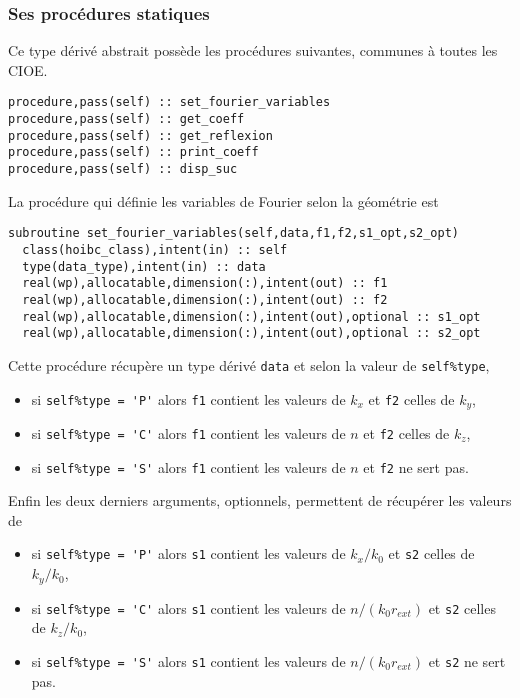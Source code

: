     \subsubsection{Ses procédures statiques}
      Ce type dérivé abstrait possède les procédures suivantes, communes à toutes les CIOE.
\begin{lstlisting}
procedure,pass(self) :: set_fourier_variables
procedure,pass(self) :: get_coeff
procedure,pass(self) :: get_reflexion
procedure,pass(self) :: print_coeff
procedure,pass(self) :: disp_suc
\end{lstlisting}

      La procédure qui définie les variables de Fourier selon la géométrie est 
\begin{lstlisting}
subroutine set_fourier_variables(self,data,f1,f2,s1_opt,s2_opt)
  class(hoibc_class),intent(in) :: self
  type(data_type),intent(in) :: data
  real(wp),allocatable,dimension(:),intent(out) :: f1
  real(wp),allocatable,dimension(:),intent(out) :: f2
  real(wp),allocatable,dimension(:),intent(out),optional :: s1_opt
  real(wp),allocatable,dimension(:),intent(out),optional :: s2_opt
\end{lstlisting}
      Cette procédure récupère un type dérivé \lstinline{data} et selon la valeur de \lstinline{self%type}, 
      \begin{itemize}
      \item si \lstinline{self%type = 'P'} alors \lstinline{f1} contient les valeurs de \(k_x\) et \lstinline{f2} celles de \(k_y\),
      \item si \lstinline{self%type = 'C'} alors \lstinline{f1} contient les valeurs de \(n\) et \lstinline{f2} celles de \(k_z\),
      \item si \lstinline{self%type = 'S'} alors \lstinline{f1} contient les valeurs de \(n\) et \lstinline{f2} ne sert pas.
      \end{itemize}
      Enfin les deux derniers arguments, optionnels, permettent de récupérer les valeurs de
      \begin{itemize}
      \item si \lstinline{self%type = 'P'} alors \lstinline{s1} contient les valeurs de \(k_x/k_0\) et \lstinline{s2} celles de \(k_y/k_0\),
      \item si \lstinline{self%type = 'C'} alors \lstinline{s1} contient les valeurs de \(n/(k_0r_{ext})\) et \lstinline{s2} celles de \(k_z/k_0\),
      \item si \lstinline{self%type = 'S'} alors \lstinline{s1} contient les valeurs de \(n/(k_0r_{ext})\) et \lstinline{s2} ne sert pas.
      \end{itemize}

